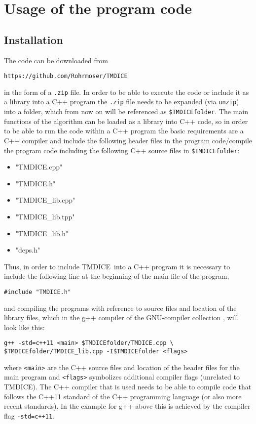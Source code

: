 \documentclass[preprint,12pt]{elsarticle}
\newcommand{\tmdice}{{\sf TMDICE}}
\begin{document}
\section{Usage of the program code}
\label{sec3}
\subsection{Installation}
The code can be downloaded from
\begin{verbatim}
https://github.com/Rohrmoser/TMDICE
\end{verbatim}
in the form of a \verb#.zip# file.
%
In order to be able to execute the code or include it as a library into a C++ program the \verb#.zip# file needs to be expanded (via \verb#unzip#) into a folder, which from now on will be referenced as 
\verb#$TMDICEfolder#.
%
The main functions of the algorithm can be loaded as a library into C++ code, so in order to be able to run the code within a C++ program the basic requirements are a C++ compiler 
and include the following header files in the program code/compile the program code including the following C++ source files in \verb#$TMDICEfolder#:
\begin{itemize}
    \item "TMDICE.cpp"
    \item "TMDICE.h"
    \item "TMDICE\_lib.cpp"
    \item "TMDICE\_lib.tpp"
    \item "TMDICE\_lib.h"
    \item "deps.h"
\end{itemize}
%
Thus, in order to include \tmdice\, into a C++ program it is necessary to include the following line at the beginning of the main file of the program,
%
\begin{verbatim}
#include "TMDICE.h"
\end{verbatim}
%
and compiling the programs with reference to source files and location of the library files, which in the g++ compiler of the GNU-compiler collection
, will look like this:
\begin{verbatim}
g++ -std=c++11 <main> $TMDICEfolder/TMDICE.cpp \
$TMDICEfolder/TMDICE_lib.cpp -I$TMDICEfolder <flags>
\end{verbatim}
where \verb#<main># are the C++ source files and location of the header files for the main program and \verb#<flags># symbolizes additional compiler flags (unrelated to \tmdice).
The C++ compiler that is used needs to be able to compile code that follows the C++11 standard of the C++ programming language (or also more recent standards). In the example for g++ above this is achieved by the compiler flag  \verb#-std=c++11#. 
\end{document}
